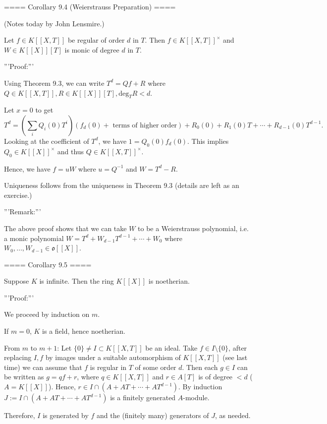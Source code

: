 

==== Corollary 9.4 (Weierstrauss Preparation) ====

(Notes today by John Lensmire.)

Let $f\in K[[X,T]]$ be regular of order $d$ in $T$.
Then $f\in K[[X,T]]^\times$ and $W\in K[[X]][T]$ is monic of degree $d$ in $T$.

'''Proof:'''

Using Theorem 9.3, we can write $T^d = Qf+R$ where $Q\in K[[X,T]], R\in K[[X]][T], \mathrm{deg}_TR < d$.

Let $x=0$ to get
$$T^d = \left( \sum_i Q_i(0) T^i \right) (f_d(0) + \textrm{ terms of higher order} )
+ R_0(0) + R_1(0) T + \cdots + R_{d-1}(0) T^{d-1}.$$
Looking at the coefficient of $T^d$, we have $1 = Q_0(0) f_d(0)$.
This implies $Q_0 \in K[[X]]^\times$ and thus $Q\in K[[X,T]]^\times$.

Hence, we have $f = uW$ where $u = Q^{-1}$ and $W = T^d - R$.

Uniqueness follows from the uniqueness in Theorem 9.3 (details are left as an exercise.)

'''Remark:'''

The above proof shows that we can take $W$ to be a Weierstrauss polynomial, i.e. a monic polynomial
$W = T^d + W_{d-1} T^{d-1} + \cdots + W_0$ where $W_0,\ldots, W_{d-1}\in \mathfrak{o}[[X]]$.

==== Corollary 9.5 ====

Suppose $K$ is infinite. Then the ring $K[[X]]$ is noetherian.

'''Proof:'''

We proceed by induction on $m$.

If $m=0$, $K$ is a field, hence noetherian.

From $m$ to $m+1$:
Let $\{0\} \neq I \subset K[[X,T]]$ be an ideal.
Take $f\in I\setminus \{0\}$, after replacing $I,f$ by images under a suitable automorphism of $K[[X,T]]$
(see last time) we can assume that $f$ is regular in $T$ of some order $d$.
Then each $g\in I$ can be written as $g = qf + r$, where $q\in K[[X,T]]$ and $r\in A[T]$ is of degree $<d$ ($A = K[[X]]$).
Hence, $r\in I \cap (A + AT + \cdots + AT^{d-1})$. By induction $J:= I\cap (A + AT + \cdots + AT^{d-1})$ is a finitely generated $A$-module.

Therefore, $I$ is generated by $f$ and the (finitely many) generators of $J$, as needed.

